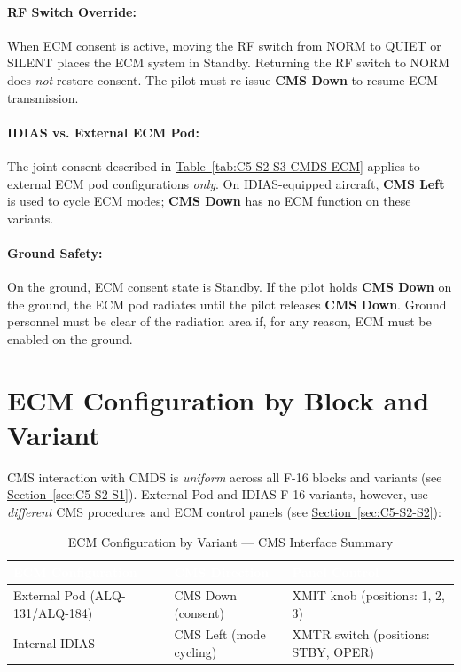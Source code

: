 \documentclass[11pt, a4paper, twoside]{report}
\newcommand{\secref}[1]{\hyperref[#1]{Section~\ref*{#1}}}
\newcommand{\tabref}[1]{\hyperref[#1]{Table~\ref*{#1}}}
\begin{document}
\paragraph{RF Switch Override:}

When ECM consent is active, moving the RF switch from NORM to QUIET or SILENT places the ECM system in Standby. Returning the RF switch to NORM does \textit{not} restore consent. The pilot must re-issue \textbf{CMS Down} to resume ECM transmission.

\paragraph{IDIAS vs. External ECM Pod:}

The joint consent described in \tabref{tab:C5-S2-S3-CMDS-ECM} applies to external ECM pod configurations \textit{only}. On IDIAS-equipped aircraft, \textbf{CMS Left} is used to cycle ECM modes; \textbf{CMS Down} has no ECM function on these variants.

\paragraph{Ground Safety:}

On the ground, ECM consent state is Standby. If the pilot holds \textbf{CMS Down} on the ground, the ECM pod radiates until the pilot releases \textbf{CMS Down}. Ground personnel must be clear of the radiation area if, for any reason, ECM must be enabled on the ground.

\section{ECM Configuration by Block and Variant}
\label{sec:C5-S3}

CMS interaction with CMDS is \textit{uniform} across all F-16 blocks and variants (see \secref{sec:C5-S2-S1}). External Pod and IDIAS F-16 variants, however, use \textit{different} CMS procedures and ECM control panels (see \secref{sec:C5-S2-S2}):

\begin{table}[H]
\centering
\caption{ECM Configuration by Variant --- CMS Interface Summary}
\label{tab:C5-S3-ecm-config-summary}
\small
\renewcommand{\arraystretch}{1.25}
\begin{tabular}{|>{\raggedright\arraybackslash}p{3.6cm}|>{\raggedright\arraybackslash}p{3.6cm}|>{\raggedright\arraybackslash}p{4.6cm}|}
\hline
\rowcolor{headerblue}
\textcolor{white}{\textbf{ECM Configuration}} & \textcolor{white}{\textbf{CMS Direction}} & \textcolor{white}{\textbf{Panel Control}} \\
\hline
External Pod (ALQ-131/ALQ-184) & CMS Down (consent) & XMIT knob (positions: 1, 2, 3) \\
\hline
Internal IDIAS & CMS Left (mode cycling) & XMTR switch (positions: STBY, OPER) \\
\hline
\end{tabular}
\end{table}
\end{document}
